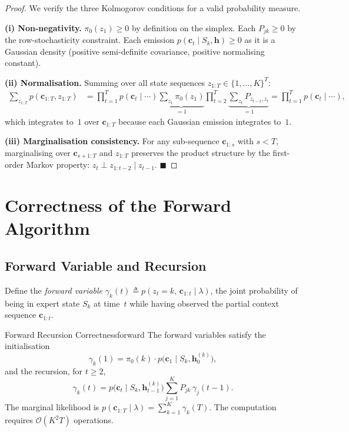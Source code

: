 \documentclass[11pt, a4paper]{article}
\newcommand{\bh}{\mathbf{h}}
\newcommand{\bc}{\mathbf{c}}
\newcommand{\QED}{\hfill$\blacksquare$}
\begin{document}
\begin{proof}
We verify the three Kolmogorov conditions for a valid probability measure.

\medskip\noindent
\textbf{(i) Non-negativity.}\;
$\pi_0(z_1)\ge 0$ by definition on the simplex.
Each $P_{jk}\ge 0$ by the row-stochasticity constraint.
Each emission $p(\bc_t\mid S_k,\bh)\ge 0$ as it is a Gaussian density
(positive semi-definite covariance, positive normalising constant).

\medskip\noindent
\textbf{(ii) Normalisation.}\;
Summing over all state sequences
$z_{1:T}\in\{1,\ldots,K\}^T$:
\begin{align*}
  \sum_{z_{1:T}} p(\bc_{1:T},z_{1:T})
  &= \prod_{t=1}^{T} p(\bc_t\mid\cdots)
     \underbrace{\sum_{z_1}\pi_0(z_1)}_{=1}
     \prod_{t=2}^{T}
     \underbrace{\sum_{z_t} P_{z_{t-1},z_t}}_{=1} = \prod_{t=1}^T p(\bc_t\mid\cdots),
\end{align*}
which integrates to~$1$ over $\bc_{1:T}$ because each Gaussian emission
integrates to~$1$.

\medskip\noindent
\textbf{(iii) Marginalisation consistency.}\;
For any sub-sequence $\bc_{1:s}$ with $s<T$, marginalising over
$\bc_{s+1:T}$ and $z_{1:T}$ preserves the product structure by the
first-order Markov property: $z_t \perp z_{1:t-2} \mid z_{t-1}$.  \QED
\end{proof}

\section{Correctness of the Forward Algorithm}

\subsection{Forward Variable and Recursion}

\noindent
Define the \emph{forward variable}
$\gamma_k(t) \triangleq p(z_t=k,\, \bc_{1:t} \mid \lambda)$,
the joint probability of being in expert state $S_k$ at time~$t$ while having
observed the partial context sequence $\bc_{1:t}$.

\begin{theorem}{Forward Recursion Correctness}{forward}
The forward variables satisfy the initialisation
\begin{equation}
  \gamma_k(1) = \pi_0(k)\cdot p\!\bigl(\bc_1 \mid S_k, \bh_0^{(k)}\bigr),
  \label{eq:fw-init}
\end{equation}
and the recursion, for $t\ge 2$,
\begin{equation}
  \gamma_k(t)
  = p\!\bigl(\bc_t \mid S_k, \bh_{t-1}^{(k)}\bigr)
    \sum_{j=1}^{K} P_{jk}\,\gamma_j(t-1).
  \label{eq:fw-rec}
\end{equation}
The marginal likelihood is
$p(\bc_{1:T}\mid\lambda) = \sum_{k=1}^{K}\gamma_k(T)$.
The computation requires $\mathcal{O}(K^2 T)$ operations.
\end{theorem}
\end{document}
